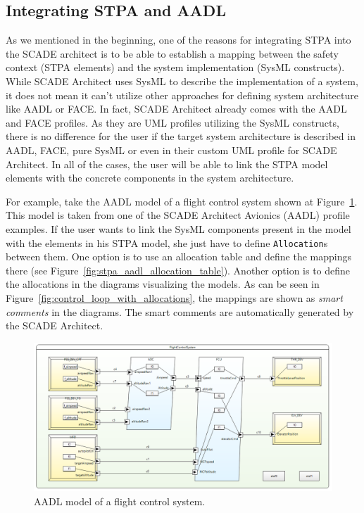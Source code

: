 \documentclass[conference]{IEEEtran}
\begin{document}
\subsection{Integrating STPA and AADL}

As we mentioned in the beginning, one of the reasons for integrating STPA into
the SCADE architect is to be able to establish a mapping between the safety
context (STPA elements) and the system implementation (SysML constructs). While
SCADE Architect uses SysML to describe the implementation of a system, it does
not mean it can't utilize other approaches for defining system architecture like
AADL or FACE. In fact, SCADE Architect already comes with the AADL and FACE
profiles. As they are UML profiles utilizing the SysML constructs, there is no
difference for the user if the target system architecture is described in AADL,
FACE, pure SysML or even in their custom UML profile for SCADE Architect. In all
of the cases, the user will be able to link the STPA model elements with the
concrete components in the system architecture.

For example, take the AADL model of a flight control system shown at
Figure~\ref{fig:aadl_model}. This model is taken from one of the SCADE Architect
Avionics (AADL) profile examples. If the user wants to link the SysML components
present in the model with the elements in his STPA model, she just have to
define \texttt{Allocation}s between them. One option is to use an allocation
table and define the mappings there (see
Figure~\ref{fig:stpa_aadl_allocation_table}). Another option is to define the
allocations in the diagrams visualizing the models. As can be seen in
Figure~\ref{fig:control_loop_with_allocations}, the mappings are shown as
\emph{smart comments} in the diagrams. The smart comments are automatically
generated by the SCADE Architect.

\begin{figure}[hbtp]
  \centering
  \includegraphics[scale=0.27]{fig/aadl_model.png}
  \caption{AADL model of a flight control system.}
  \label{fig:aadl_model}
\end{figure}
\end{document}
